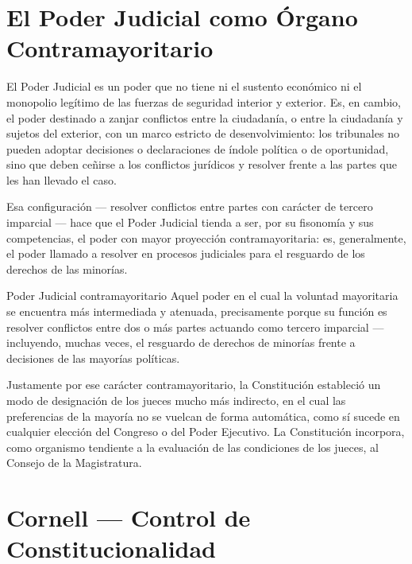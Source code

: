 \documentclass[12pt,oneside]{book}
\begin{document}
\section{El Poder Judicial como Órgano Contramayoritario}

El Poder Judicial es un poder que no tiene ni el sustento económico ni el monopolio legítimo de las fuerzas de seguridad interior y exterior. Es, en cambio, el poder destinado a zanjar conflictos entre la ciudadanía, o entre la ciudadanía y sujetos del exterior, con un marco estricto de desenvolvimiento: los tribunales no pueden adoptar decisiones o declaraciones de índole política o de oportunidad, sino que deben ceñirse a los conflictos jurídicos y resolver frente a las partes que les han llevado el caso.

Esa configuración --- resolver conflictos entre partes con carácter de tercero imparcial --- hace que el Poder Judicial tienda a ser, por su fisonomía y sus competencias, el poder con mayor proyección contramayoritaria: es, generalmente, el poder llamado a resolver en procesos judiciales para el resguardo de los derechos de las minorías.

\begin{definition}{Poder Judicial contramayoritario}
Aquel poder en el cual la voluntad mayoritaria se encuentra más intermediada y atenuada, precisamente porque su función es resolver conflictos entre dos o más partes actuando como tercero imparcial --- incluyendo, muchas veces, el resguardo de derechos de minorías frente a decisiones de las mayorías políticas.
\end{definition}

Justamente por ese carácter contramayoritario, la Constitución estableció un modo de designación de los jueces mucho más indirecto, en el cual las preferencias de la mayoría no se vuelcan de forma automática, como sí sucede en cualquier elección del Congreso o del Poder Ejecutivo. La Constitución incorpora, como organismo tendiente a la evaluación de las condiciones de los jueces, al Consejo de la Magistratura.

\section*{Cornell --- Control de Constitucionalidad}
\end{document}
